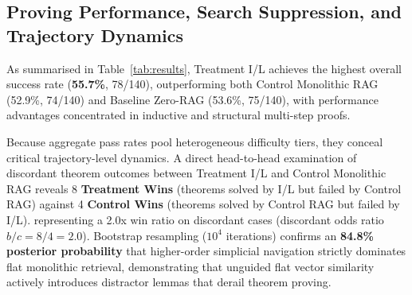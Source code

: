 \documentclass{svproc}
\begin{document}
\subsection{Proving Performance, Search Suppression, and Trajectory Dynamics}\label{sec:results}

As summarised in Table~\ref{tab:results}, Treatment I/L achieves the highest overall success rate (\textbf{55.7\%}, 78/140), outperforming both Control Monolithic RAG (52.9\%, 74/140) and Baseline Zero-RAG (53.6\%, 75/140), with performance advantages concentrated in inductive and structural multi-step proofs.

Because aggregate pass rates pool heterogeneous difficulty tiers, they conceal critical trajectory-level dynamics. A direct head-to-head examination of discordant theorem outcomes between Treatment I/L and Control Monolithic RAG reveals 8 \textbf{Treatment Wins} (theorems solved by I/L but failed by Control RAG) against 4 \textbf{Control Wins} (theorems solved by Control RAG but failed by I/L). representing a 2.0x win ratio on discordant cases (discordant odds ratio $b/c = 8/4 = 2.0$). Bootstrap resampling ($10^4$ iterations) confirms an \textbf{84.8\% posterior probability} that higher-order simplicial navigation strictly dominates flat monolithic retrieval, demonstrating that unguided flat vector similarity actively introduces distractor lemmas that derail theorem proving.

\begin{table}[t!]
\centering
\caption{Empirical proving success across 140 formal theorems (420 live trials).}
\label{tab:results}
\end{table}
\end{document}
